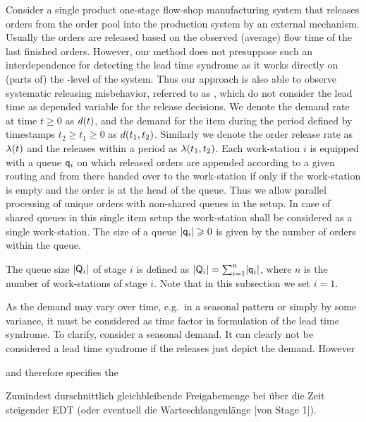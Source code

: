 \documentclass[mnsc]{informs3}
\begin{document}
Consider a single product one-stage flow-shop manufacturing system that releases orders from the
order pool into the production system by an external mechanism.
%
Usually the orders are released based on the observed (average) flow time of the last finished
orders. However, our method does not presuppose such an interdependence for detecting the lead time
syndrome as it works directly on (parts of) the \WIP{}-level of the system. Thus our approach is
also able to observe systematic releasing misbehavior, referred to as \LTS{}, which do not consider
the lead time as depended variable for the release decisions.
%
%
We denote the demand rate at time $t \geqslant 0$ as ${d}(t)$, and the demand for the item during
the period defined by timestamps $t_{2} \geqslant t_{1} \geqslant 0$ as ${d}(t_{1},t_{2})$.
Similarly we denote the order release rate as ${\lambda}(t)$ and the releases within a period as
${\lambda}(t_{1},t_{2})$. Each work-station $i$ is equipped with a queue $\mathsf{q}_{i}$ on which released
orders are appended according to a given routing and from there handed over to the work-station if
only if the work-station is empty and the order is at the head of the queue. Thus we allow parallel
processing of unique orders with non-shared queues in the setup. In case of shared queues in this
single item setup the work-station shall be considered as a single work-station. The size of a queue
$\lvert{\mathsf{q}_{i}}\rvert \geqslant 0$ is given by the number of orders within the queue.


\begin{definition}

  The queue size $\lvert{\mathsf{Q}_{i}}\rvert$ of stage $i$ is defined as
  $\lvert{\mathsf{Q}_{i}}\rvert = \sum_{i=1}^{n} \lvert{\mathsf{q}_{i}}\rvert$, where $n$ is the number of work-stations of stage
  $i$. Note that in this subsection we set $i=1$.

\end{definition}


As the demand may vary over time, e.g.~in a seasonal pattern or simply by some variance, it must be
considered as time factor in formulation of the lead time syndrome. To clarify, consider a seasonal
demand. It can clearly not be considered a lead time syndrome if the releases just depict the
demand. However

and therefore
specifies the


Zumindest durschnittlich gleichbleibende Freigabemenge bei über die Zeit steigender EDT (oder
eventuell die Warteschlangenlänge [von Stage 1]).
\end{document}
